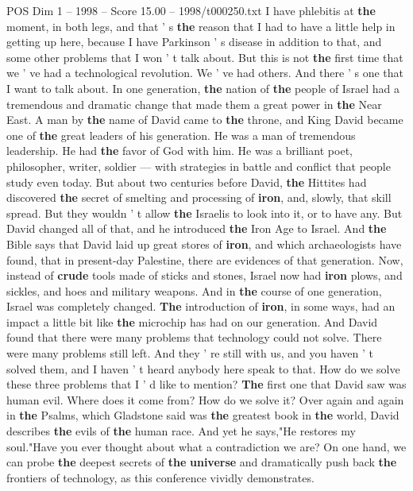 \begin{textsample}{POS Dim 1 – 1998 – Score 15.00 – 1998/t000250.txt}
I have phlebitis at \textbf{the} moment, in both legs, and that ' s \textbf{the} reason that I had to have a little help in getting up here, because I have Parkinson ' s disease in addition to that, and some other problems that I won ' t talk about.
But this is not \textbf{the} first time that we ' ve had a technological revolution.
We ' ve had others.
And there ' s one that I want to talk about.
In one generation, \textbf{the} nation of \textbf{the} people of Israel had a tremendous and dramatic change that made them a great power in \textbf{the} Near East.
A man by \textbf{the} name of David came to \textbf{the} throne, and King David became one of \textbf{the} great leaders of his generation.
He was a man of tremendous leadership.
He had \textbf{the} favor of God with him.
He was a brilliant poet, philosopher, writer, soldier — with strategies in battle and conflict that people study even today.
But about two centuries before David, \textbf{the} Hittites had discovered \textbf{the} secret of smelting and processing of \textbf{iron}, and, slowly, that skill spread.
But they wouldn ' t allow \textbf{the} Israelis to look into it, or to have any.
But David changed all of that, and he introduced \textbf{the} Iron Age to Israel.
And \textbf{the} Bible says that David laid up great stores of \textbf{iron}, and which archaeologists have found, that in present-day Palestine, there are evidences of that generation.
Now, instead of \textbf{crude} tools made of sticks and stones, Israel now had \textbf{iron} plows, and sickles, and hoes and military weapons.
And in \textbf{the} course of one generation, Israel was completely changed. \textbf{The} introduction of \textbf{iron}, in some ways, had an impact a little bit like \textbf{the} microchip has had on our generation.
And David found that there were many problems that technology could not solve.
There were many problems still left.
And they ' re still with us, and you haven ' t solved them, and I haven ' t heard anybody here speak to that.
How do we solve these three problems that I ' d like to mention? \textbf{The} first one that David saw was human evil.
Where does it come from?
How do we solve it?
Over again and again in \textbf{the} Psalms, which Gladstone said was \textbf{the} greatest book in \textbf{the} world, David describes \textbf{the} evils of \textbf{the} human race.
And yet he says,"He restores my soul."Have you ever thought about what a contradiction we are?
On one hand, we can probe \textbf{the} deepest secrets of \textbf{the} \textbf{universe} and dramatically push back \textbf{the} frontiers of technology, as this conference vividly demonstrates.

\end{textsample}
